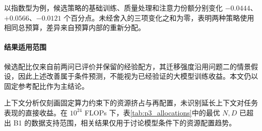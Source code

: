\documentclass[bwprint]{gmcmthesis}
\numberwithin{equation}{section}
\numberwithin{figure}{section}
\numberwithin{table}{section}
\begin{document}
        以指数型为例，候选策略的基础训练、质量处理和注意力份额分别变化 $-0.0444$、$+0.0566$、$-0.0121$ 个百分点。未经舍入的三项变化之和为零，表明两种策略使用相同总预算，差异来自预算内部的重新分配。

        \paragraph{结果适用范围}

        候选配比仅来自前两问已评价并保留的经验配方，其迁移强度沿用问题二的情景假设，因此上述改善属于条件预测，不能视为已经验证的大模型训练收益。本文仍以固定参考配比作为主结论。

        上下文分析仅刻画固定算力约束下的资源挤占与再配置，未识别延长上下文对任务表现的直接收益。在 $10^{24}$ FLOPs 下，表\ref{tab:p3_allocations}中的最优 $N,D$ 已超出 B1 的数据支持范围，相关结果仅用于讨论模型条件下的资源配置趋势。




\end{document}
